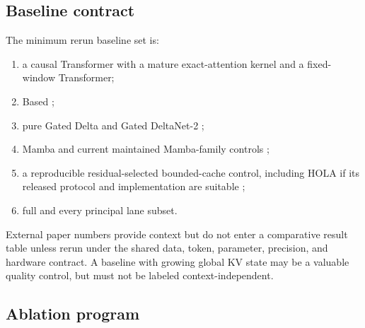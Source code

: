 \subsection{Baseline contract}

The minimum rerun baseline set is:

\begin{enumerate}
  \item a causal Transformer with a mature exact-attention kernel and a
  fixed-window Transformer;
  \item Based \citep{arora2024based};
  \item pure Gated Delta and Gated DeltaNet-2
  \citep{yang2025gated,hatamizadeh2026gated};
  \item Mamba and current maintained Mamba-family controls
  \citep{gu2024mamba,dao2024transformers,lahoti2026mamba3};
  \item a reproducible residual-selected bounded-cache control, including HOLA
  if its released protocol and implementation are suitable
  \citep{cui2026hippocampus};
  \item full \ALUCLU and every principal lane subset.
\end{enumerate}

External paper numbers provide context but do not enter a comparative result
table unless rerun under the shared data, token, parameter, precision, and
hardware contract. A baseline with growing global KV state may be a valuable
quality control, but must not be labeled context-independent.

\subsection{Ablation program}

